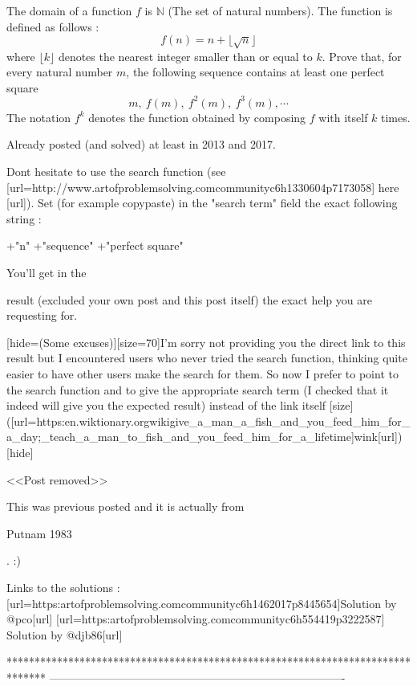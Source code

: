 \begin{solution}
	\begin{tcolorbox}The domain of a function $f$ is $\mathbb{N}$ (The set of natural numbers). The function is defined as follows : $$f(n)=n+\lfloor\sqrt{n}\rfloor$$ where $\lfloor k\rfloor$ denotes the nearest integer smaller than or equal to $k$. Prove that, for every natural number $m$, the following sequence contains at least one perfect square $$m,~f(m),~f^2(m),~f^3(m),\cdots$$ The notation $f^k$ denotes the function obtained by composing $f$ with itself $k$ times.\end{tcolorbox}
Already posted (and solved) at least in 2013 and 2017.

Dont hesitate to use the search function (see [url=http://www.artofproblemsolving.com\/community\/c6h1330604p7173058] here [\/url]).
Set (for example copy\/paste) in the "search term" field the exact following string : 

+"\sqrt n" +"sequence" +"perfect square"

You'll get in the result (excluded your own post and this post itself) the exact help you are requesting for.

[hide=(Some excuses)][size=70]I'm sorry not providing you the direct link to this result but I encountered users who never tried the search function, thinking quite easier to have other users make the search for them. So now I prefer to point to the search function and to give the appropriate search term (I checked that it indeed will give you the expected result) instead of the link itself [\/size]([url=https:\/\/en.wiktionary.org\/wiki\/give_a_man_a_fish_and_you_feed_him_for_a_day;_teach_a_man_to_fish_and_you_feed_him_for_a_lifetime]wink[\/url])[\/hide]


\end{solution}



\begin{solution}
	<<Post removed>>
\end{solution}



\begin{solution}
	This was previous posted and it is actually from \begin{bolded}Putnam 1983\end{bolded}. :)

Links to the solutions :
[url=https:\/\/artofproblemsolving.com\/community\/c6h1462017p8445654]Solution by @pco[\/url]
[url=https:\/\/artofproblemsolving.com\/community\/c6h554419p3222587] Solution by @djb86[\/url]
\end{solution}
*******************************************************************************
-------------------------------------------------------------------------------

